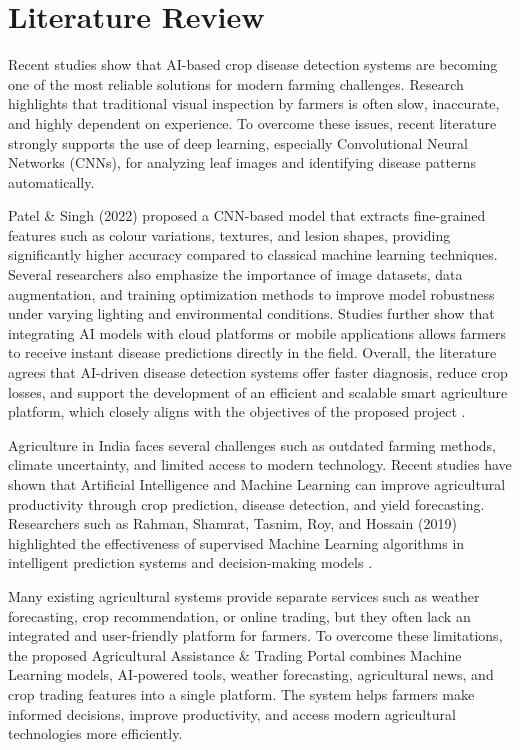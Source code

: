 
\section{Literature Review}

Recent studies show that AI-based crop disease detection systems are becoming one of the most reliable solutions for modern farming challenges. Research highlights that traditional visual inspection by farmers is often slow, inaccurate, and highly dependent on experience. To overcome these issues, recent literature strongly supports the use of deep learning, especially Convolutional Neural Networks (CNNs), for analyzing leaf images and identifying disease patterns automatically.

Patel \& Singh (2022) proposed a CNN-based model that extracts fine-grained features such as colour variations, textures, and lesion shapes, providing significantly higher accuracy compared to classical machine learning techniques. Several researchers also emphasize the importance of image datasets, data augmentation, and training optimization methods to improve model robustness under varying lighting and environmental conditions. Studies further show that integrating AI models with cloud platforms or mobile applications allows farmers to receive instant disease predictions directly in the field. Overall, the literature agrees that AI-driven disease detection systems offer faster diagnosis, reduce crop losses, and support the development of an efficient and scalable smart agriculture platform, which closely aligns with the objectives of the proposed project \cite{ref1}.

Agriculture in India faces several challenges such as outdated farming methods, climate uncertainty, and limited access to modern technology. Recent studies have shown that Artificial Intelligence and Machine Learning can improve agricultural productivity through crop prediction, disease detection, and yield forecasting. Researchers such as Rahman, Shamrat, Tasnim, Roy, and Hossain (2019) highlighted the effectiveness of supervised Machine Learning algorithms in intelligent prediction systems and decision-making models \cite{ref2}.

Many existing agricultural systems provide separate services such as weather forecasting, crop recommendation, or online trading, but they often lack an integrated and user-friendly platform for farmers. To overcome these limitations, the proposed Agricultural Assistance \& Trading Portal combines Machine Learning models, AI-powered tools, weather forecasting, agricultural news, and crop trading features into a single platform. The system helps farmers make informed decisions, improve productivity, and access modern agricultural technologies more efficiently.

